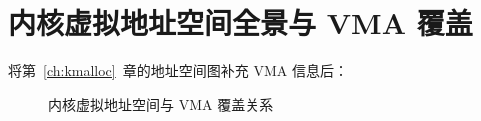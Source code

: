 \section{内核虚拟地址空间全景与 VMA 覆盖}

将第~\ref{ch:kmalloc}~章的地址空间图补充 VMA 信息后：

\begin{figure}[H]
  \centering
  
  \caption{内核虚拟地址空间与 VMA 覆盖关系}
  \label{fig:vma-vaddr-space}
\end{figure}


